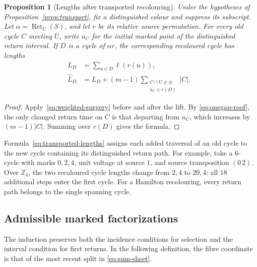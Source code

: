 \documentclass[11pt,reqno]{amsart}
\numberwithin{equation}{section}
\newtheorem{proposition}[theorem]{Proposition}
\theoremstyle{definition}
\theoremstyle{remark}
\newcommand{\Ret}{\operatorname{Ret}}
\begin{document}
\begin{proposition}[Lengths after transported recolouring]\label{prop:transported-lengths}
Under the hypotheses of Proposition~\ref{prop:transport}, fix a distinguished
colour and suppress its subscript. Let $\alpha=\Ret_U(S)$, and let $r$ be its
relative source permutation. For every old cycle $C$ meeting $U$, write
$u_C$ for the initial marked point of the distinguished return interval.
If $D$ is a cycle of $\alpha r$, the corresponding recoloured cycle has lengths
\begin{equation}\label{eq:transported-lengths}
 \begin{aligned}
 L_D&=\sum_{u\in D}\ell(r(u)),\\
 \widehat L_D&=L_D+(m-1)
       \sum_{\substack{C\cap U\ne\varnothing\\u_C\in r(D)}}|C|.
 \end{aligned}
\end{equation}
\end{proposition}
\begin{proof}
Apply~\eqref{eq:weighted-surgery} before and after the lift. By
\eqref{eq:onegap-roof}, the only changed return time on $C$ is that departing
from $u_C$, which increases by $(m-1)|C|$. Summing over $r(D)$ gives the formula.
\end{proof}

Formula~\eqref{eq:transported-lengths} assigns each added traversal of
an old cycle to the new cycle containing its distinguished return path.
For example, take a $6$-cycle with marks $0,2,4$, unit voltage at source
$1$, and source transposition $(0\,2)$. Over $\mathbb Z_4$, the two
recoloured cycle lengths change from $2,4$ to $20,4$: all $18$ additional
steps enter the first cycle. For a Hamilton recolouring, every return
path belongs to the single spanning cycle.

\subsection{Admissible marked factorizations}
The induction preserves both the incidence conditions for selection and
the interval condition for first returns. In the following definition,
the fibre coordinate is that of the most recent split in
\eqref{eq:sum-sheet}.
\end{document}
